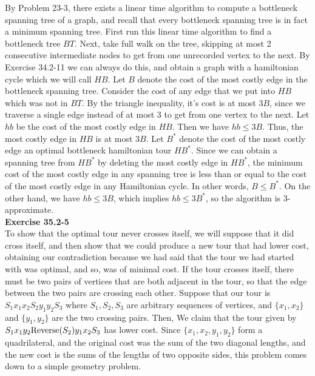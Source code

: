 \documentclass{article}
\begin{document}
By Problem 23-3, there exists a linear time algorithm to compute a bottleneck spanning tree of a graph, and recall that every bottleneck spanning tree is in fact a minimum spanning tree.  First run this linear time algorithm to find a bottleneck tree $BT$. Next, take full walk on the tree, skipping at most 2 consecutive intermediate nodes to get from one unrecorded vertex to the next.  By Exercise 34.2-11 we can always do this, and obtain a graph with a hamiltonian cycle which we will call $HB$.  Let $B$ denote the cost of the most costly edge in the bottleneck spanning tree.  Consider the cost of any edge that we put into $HB$ which was not in $BT$.  By the triangle inequality, it's cost is at most $3B$, since we traverse a single edge instead of at most 3 to get from one vertex to the next.   Let $hb$ be the cost of the most costly edge in $HB$.  Then we have $hb \leq 3B$.  Thus, the most costly edge in $HB$ is at most $3B$.  Let $B^*$ denote the cost of the most costly edge an optimal bottleneck hamiltonian tour $HB^*$.  Since we can obtain a spanning tree from $HB^*$ by deleting the most costly edge in $HB^*$, the minimum cost of the most costly edge in any spanning tree is less than or equal to the cost of the most costly edge in any Hamiltonian cycle.  In other words, $B \leq B^*$.  On the other hand, we have $hb \leq 3B$, which implies $hb \leq 3B^*$, so the algorithm is 3-approximate.  \\

\noindent\textbf{Exercise 35.2-5}\\

To show that the optimal tour never crosses itself, we will suppose that it did cross itself, and then show that we could produce a new tour that had lower cost, obtaining our contradiction because we had said that the tour we had started with was optimal, and so, was of minimal cost. If the tour crosses itself, there must be two pairs of vertices that are both adjacent in the tour, so that the edge between the two pairs are crossing each other. Suppose that our tour is $S_1x_1 x_2 S_2 y_1 y_2 S_3$ where $S_1,S_2,S_3$ are arbitrary sequences of vertices, and $\{x_1,x_2\}$ and $\{y_1,y_2\}$ are the two crossing pairs. Then, We claim that the tour given by $S_1 x_1 y_2 \hbox{Reverse}(S_2) y_1 x_2 S_3$ has lower cost. Since $\{x_1,x_2,y_1,y_2\}$ form a quadrilateral, and the original cost was the sum of the two diagonal lengths, and the new cost is the sums of the lengths of two opposite sides, this problem comes down to a simple geometry problem.
\end{document}

